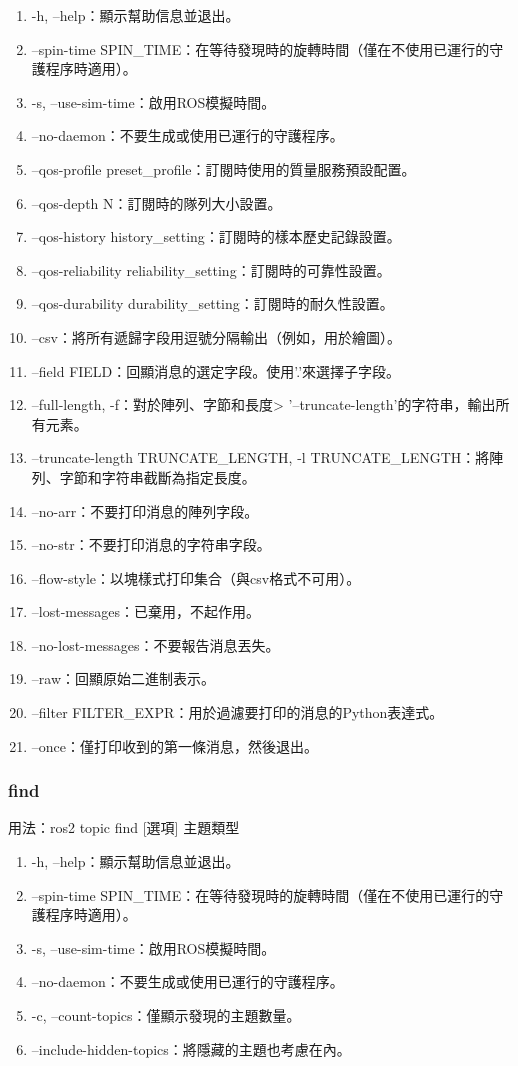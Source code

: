 \begin{enumerate}
    \item -h, --help：顯示幫助信息並退出。
    \item --spin-time SPIN\_TIME：在等待發現時的旋轉時間（僅在不使用已運行的守護程序時適用）。
    \item -s, --use-sim-time：啟用ROS模擬時間。
    \item --no-daemon：不要生成或使用已運行的守護程序。
    \item --qos-profile {preset\_profile}：訂閱時使用的質量服務預設配置。
    \item --qos-depth N：訂閱時的隊列大小設置。
    \item --qos-history {history\_setting}：訂閱時的樣本歷史記錄設置。
    \item --qos-reliability {reliability\_setting}：訂閱時的可靠性設置。
    \item --qos-durability {durability\_setting}：訂閱時的耐久性設置。
    \item --csv：將所有遞歸字段用逗號分隔輸出（例如，用於繪圖）。
    \item --field FIELD：回顯消息的選定字段。使用'.'來選擇子字段。
    \item --full-length, -f：對於陣列、字節和長度> '--truncate-length'的字符串，輸出所有元素。
    \item --truncate-length TRUNCATE\_LENGTH, -l TRUNCATE\_LENGTH：將陣列、字節和字符串截斷為指定長度。
    \item --no-arr：不要打印消息的陣列字段。
    \item --no-str：不要打印消息的字符串字段。
    \item --flow-style：以塊樣式打印集合（與csv格式不可用）。
    \item --lost-messages：已棄用，不起作用。
    \item --no-lost-messages：不要報告消息丟失。
    \item --raw：回顯原始二進制表示。
    \item --filter FILTER\_EXPR：用於過濾要打印的消息的Python表達式。
    \item --once：僅打印收到的第一條消息，然後退出。
\end{enumerate}
\subsubsection{find}
用法：ros2 topic find [選項] 主題類型


\begin{enumerate}
    \item -h, --help：顯示幫助信息並退出。
    \item --spin-time SPIN\_TIME：在等待發現時的旋轉時間（僅在不使用已運行的守護程序時適用）。
    \item -s, --use-sim-time：啟用ROS模擬時間。
    \item --no-daemon：不要生成或使用已運行的守護程序。
    \item -c, --count-topics：僅顯示發現的主題數量。
    \item --include-hidden-topics：將隱藏的主題也考慮在內。
\end{enumerate}

